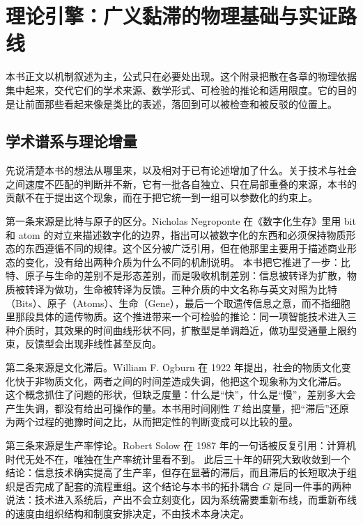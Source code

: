 \chapter{理论引擎：广义黏滞的物理基础与实证路线}

本书正文以机制叙述为主，公式只在必要处出现。这个附录把散在各章的物理依据集中起来，交代它们的学术来源、数学形式、可检验的推论和适用限度。它的目的是让前面那些看起来像是类比的表述，落回到可以被检查和被反驳的位置上。

\section{学术谱系与理论增量}

先说清楚本书的想法从哪里来，以及相对于已有论述增加了什么。关于技术与社会之间速度不匹配的判断并不新，它有一批各自独立、只在局部重叠的来源，本书的贡献不在于提出这个现象，而在于把它统一到一组可以参数化的约束上。

第一条来源是比特与原子的区分。Nicholas Negroponte 在《数字化生存》里用 bit 和 atom 的对立来描述数字化的边界，指出可以被数字化的东西和必须保持物质形态的东西遵循不同的规律。这个区分被广泛引用，但在他那里主要用于描述商业形态的变化，没有给出两种介质为什么不同的机制说明。\cite{negroponte1995being} 本书把它推进了一步：比特、原子与生命的差别不是形态差别，而是吸收机制差别：信息被转译为扩散，物质被转译为做功，生命被转译为反馈。三种介质的中文名称与英文对照为比特（Bits）、原子（Atoms）、生命（Gene），最后一个取遗传信息之意，而不指细胞里那段具体的遗传物质。这个推进带来一个可检验的推论：同一项智能技术进入三种介质时，其效果的时间曲线形状不同，扩散型是单调趋近，做功型受通量上限约束，反馈型会出现非线性甚至反向。

第二条来源是文化滞后。William F. Ogburn 在 1922 年提出，社会的物质文化变化快于非物质文化，两者之间的时间差造成失调，他把这个现象称为文化滞后。\cite{ogburn1922social} 这个概念抓住了问题的形状，但缺乏度量：什么是“快”，什么是“慢”，差别多大会产生失调，都没有给出可操作的量。本书用时间刚性 $T$ 给出度量，把“滞后”还原为两个过程的弛豫时间之比，从而把定性的判断变成可以比较的量。

第三条来源是生产率悖论。Robert Solow 在 1987 年的一句话被反复引用：计算机时代无处不在，唯独在生产率统计里看不到。\cite{solow1987watch} 此后三十年的研究大致收敛到一个结论：信息技术确实提高了生产率，但存在显著的滞后，而且滞后的长短取决于组织是否完成了配套的流程重组。这个结论与本书的拓扑耦合 $G$ 是同一件事的两种说法：技术进入系统后，产出不会立刻变化，因为系统需要重新布线，而重新布线的速度由组织结构和制度安排决定，不由技术本身决定。

